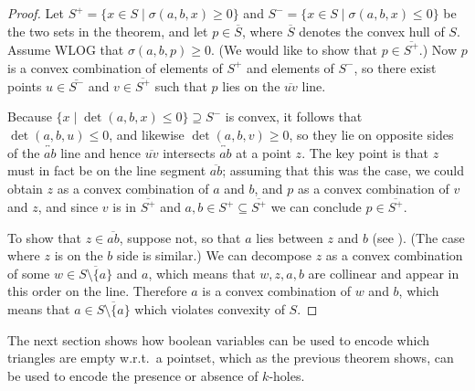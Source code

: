 \begin{proof}
    Let $S^+=\{x\in S\mid \sigma(a,b,x)\ge 0\}$ and $S^-=\{x\in S\mid \sigma(a,b,x)\le 0\}$ be the two sets in the theorem, and let $p\in \overline{S}$, where $\overline{S}$ denotes the convex hull of $S$. Assume WLOG that $\sigma(a,b,p)\ge 0$. (We would like to show that $p\in \overline{S^+}$.) Now $p$ is a convex combination of elements of $S^+$ and elements of $S^-$, so there exist points $u\in \overline{S^-}$ and $v\in \overline{S^+}$ such that $p$ lies on the $\overline{uv}$ line.

    Because $\{x\mid \det(a,b,x)\le 0\}\supseteq S^-$ is convex, it follows that $\det(a,b,u)\le 0$, and likewise $\det(a,b,v)\ge 0$, so they lie on opposite sides of the $\overleftrightarrow{ab}$ line and hence $\overline{uv}$ intersects $\overleftrightarrow{ab}$ at a point $z$. The key point is that $z$ must in fact be on the line segment $\overline{ab}$; assuming that this was the case, we could obtain $z$ as a convex combination of $a$ and $b$, and $p$ as a convex combination of $v$ and $z$, and since $v$ is in $\overline{S^+}$ and $a,b\in S^+\subseteq\overline{S^+}$ we can conclude $p\in \overline{S^+}$.

    To show that $z\in \overline{ab}$, suppose not, so that $a$ lies between $z$ and $b$ (see ). (The case where $z$ is on the $b$ side is similar.) We can decompose $z$ as a convex combination of some $w\in \overline{S\setminus\{a\}}$ and $a$, which means that $w,z,a,b$ are collinear and appear in this order on the line. Therefore $a$ is a convex combination of $w$ and $b$, which means that $a\in \overline{S\setminus\{a\}}$ which violates convexity of $S$.
\end{proof}
    
The next section shows how boolean variables can be used to encode which triangles are empty w.r.t.~a pointset, which as the previous theorem shows, can be used to encode the presence or absence of $k$-holes.
